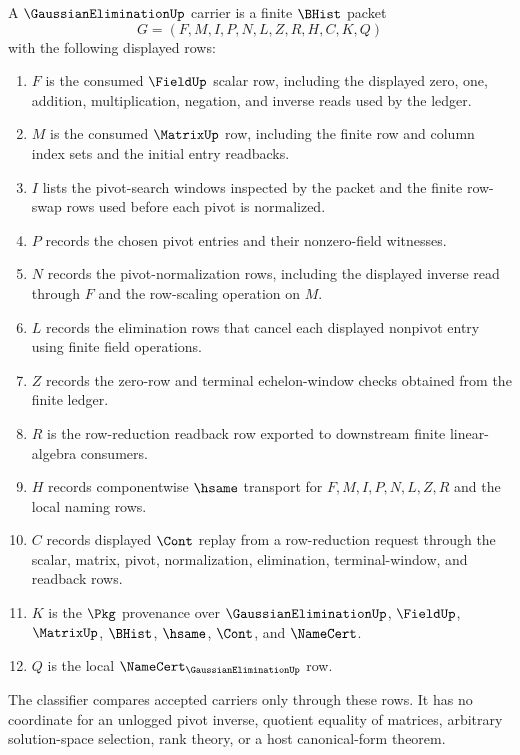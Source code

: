\begin{definition}
\label{def:gaussian-elimination-carrier}
A $\GaussianEliminationUp$ carrier is a finite $\BHist$ packet
$$
G=(F,M,I,P,N,L,Z,R,H,C,K,Q)
$$
with the following displayed rows:
\begin{enumerate}
\item $F$ is the consumed $\FieldUp$ scalar row, including the displayed zero, one, addition, multiplication, negation, and inverse reads used by the ledger.
\item $M$ is the consumed $\MatrixUp$ row, including the finite row and column index sets and the initial entry readbacks.
\item $I$ lists the pivot-search windows inspected by the packet and the finite row-swap rows used before each pivot is normalized.
\item $P$ records the chosen pivot entries and their nonzero-field witnesses.
\item $N$ records the pivot-normalization rows, including the displayed inverse read through $F$ and the row-scaling operation on $M$.
\item $L$ records the elimination rows that cancel each displayed nonpivot entry using finite field operations.
\item $Z$ records the zero-row and terminal echelon-window checks obtained from the finite ledger.
\item $R$ is the row-reduction readback row exported to downstream finite linear-algebra consumers.
\item $H$ records componentwise $\hsame$ transport for $F,M,I,P,N,L,Z,R$ and the local naming rows.
\item $C$ records displayed $\Cont$ replay from a row-reduction request through the scalar, matrix, pivot, normalization, elimination, terminal-window, and readback rows.
\item $K$ is the $\Pkg$ provenance over $\GaussianEliminationUp$, $\FieldUp$, $\MatrixUp$, $\BHist$, $\hsame$, $\Cont$, and $\NameCert$.
\item $Q$ is the local $\NameCert_{\GaussianEliminationUp}$ row.
\end{enumerate}
The classifier compares accepted carriers only through these rows. It has no coordinate for an unlogged pivot inverse, quotient equality of matrices, arbitrary solution-space selection, rank theory, or a host canonical-form theorem.
\end{definition}

